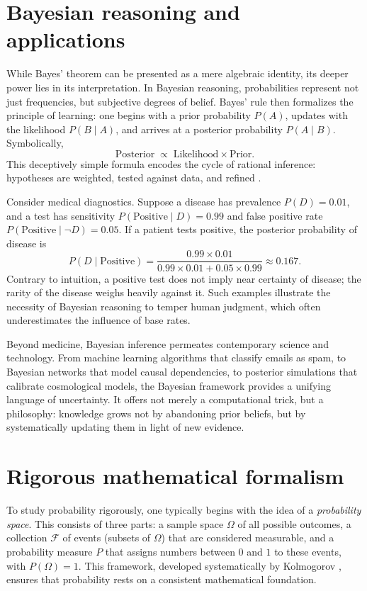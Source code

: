 \documentclass{book}
\begin{document}
\section{Bayesian reasoning and applications}

While Bayes’ theorem can be presented as a mere algebraic identity, its deeper power lies in its interpretation. In Bayesian reasoning, probabilities represent not just frequencies, but subjective degrees of belief. Bayes’ rule then formalizes the principle of learning: one begins with a prior probability $P(A)$, updates with the likelihood $P(B \mid A)$, and arrives at a posterior probability $P(A \mid B)$. Symbolically,
\[
\text{Posterior} \;\propto\; \text{Likelihood} \times \text{Prior}.
\]
This deceptively simple formula encodes the cycle of rational inference: hypotheses are weighted, tested against data, and refined \cite{jaynes2003probability}.

Consider medical diagnostics. Suppose a disease has prevalence $P(D) = 0.01$, and a test has sensitivity $P(\text{Positive} \mid D) = 0.99$ and false positive rate $P(\text{Positive} \mid \neg D) = 0.05$. If a patient tests positive, the posterior probability of disease is
\[
P(D \mid \text{Positive}) = \frac{0.99 \times 0.01}{0.99 \times 0.01 + 0.05 \times 0.99} \approx 0.167.
\]
Contrary to intuition, a positive test does not imply near certainty of disease; the rarity of the disease weighs heavily against it. Such examples illustrate the necessity of Bayesian reasoning to temper human judgment, which often underestimates the influence of base rates.

Beyond medicine, Bayesian inference permeates contemporary science and technology. From machine learning algorithms that classify emails as spam, to Bayesian networks that model causal dependencies, to posterior simulations that calibrate cosmological models, the Bayesian framework provides a unifying language of uncertainty. It offers not merely a computational trick, but a philosophy: knowledge grows not by abandoning prior beliefs, but by systematically updating them in light of new evidence.

\section{Rigorous mathematical formalism}

To study probability rigorously, one typically begins with the idea of a \emph{probability space}. This consists of three parts: a sample space $\Omega$ of all possible outcomes, a collection $\mathcal{F}$ of events (subsets of $\Omega$) that are considered measurable, and a probability measure $P$ that assigns numbers between $0$ and $1$ to these events, with $P(\Omega) = 1$. This framework, developed systematically by Kolmogorov \cite{kolmogorov1933foundations}, ensures that probability rests on a consistent mathematical foundation.
\end{document}
